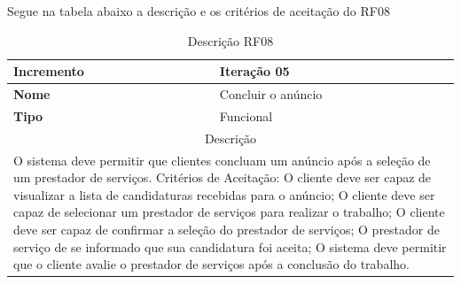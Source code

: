 \clearpage
Segue na tabela abaixo a descrição e os critérios de aceitação do RF08
\begin{table}[htb]
	\centering
	\caption{\label{Formatação do texto.}Descrição RF08}	
	\begin{tabular}{|l|p{11cm}|}
		\hline
		\textbf{Incremento}    & Iteração 05\\ \hline
		\textbf{Nome}    & Concluir o anúncio\\ \hline
		\textbf{Tipo}    & Funcional\\ \hline
		\multicolumn{2}{|c|}{Descrição}\\ \hline
		\multicolumn{2}{|p{12cm}|}{
			O sistema deve permitir que clientes concluam um anúncio após a seleção de um prestador de serviços. \newline
			\newline Critérios de Aceitação: \newline
			O cliente deve ser capaz de visualizar a lista de candidaturas recebidas para o anúncio; \newline
            O cliente deve ser capaz de selecionar um prestador de serviços para realizar o trabalho; \newline
			O cliente deve ser capaz de confirmar a seleção do prestador de serviços; \newline
			O prestador de serviço de se informado que sua candidatura foi aceita; \newline
			O sistema deve permitir que o cliente avalie o prestador de serviços após a conclusão do trabalho.
			} \\ \hline
	\end{tabular}
\end{table}

